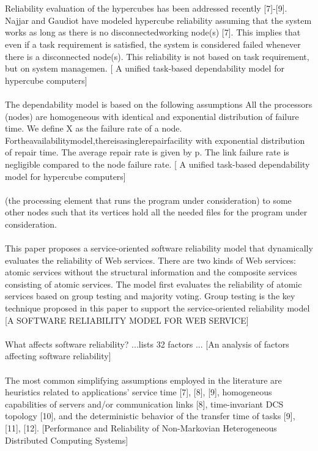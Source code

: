 \documentclass{cslthse-msc}
\begin{document}
\\\\
Reliability evaluation of the hypercubes has been addressed recently [7]-[9]. Najjar and Gaudiot have modeled hypercube reliability assuming that the system works as long as there is no disconnectedworking node(s) [7]. This implies that even if a task requirement is satisfied, the system is considered failed whenever there is a disconnected node(s). This reliability is not based on task requirement, but on system managemen.  [ A unified task-based dependability model for hypercube computers]
\\\\
The dependability model is based on the following assumptions All the processors (nodes) are homogeneous with identical and exponential distribution of failure time. We define X as the failure rate of a node. Fortheavailabilitymodel,thereisasinglerepairfacility with exponential distribution of repair time. The average repair rate is given by p.
The link failure rate is negligible compared to the node failure rate. [ A unified task-based dependability model for hypercube computers]
\\\\
(the processing element that runs the program under consideration) to some other nodes such that its vertices hold all the needed files for the program under consideration. \cite{Reliability analysis of distributed systems based on a fast reliability algorithm}
\\\\
This paper proposes a service-oriented software reliability model that dynamically evaluates the reliability of Web services. There are two kinds of Web services: atomic services without the structural information and the composite services consisting of atomic services. The model first evaluates the reliability of atomic services based on group testing and majority voting. Group testing is the key technique proposed in this paper to support the service-oriented reliability model [A SOFTWARE RELIABILITY MODEL FOR WEB SERVICE]
\\\\
What affects software reliability? ...lists 32 factors ... [An analysis of factors affecting software reliability]
\\\\
The most common simplifying assumptions employed in the literature are heuristics related to applications’ service time [7], [8], [9], homogeneous capabilities of servers and/or communication links [8], time-invariant DCS topology [10], and the deterministic behavior of the transfer time of tasks [9], [11], [12]. [Performance and Reliability of Non-Markovian Heterogeneous Distributed Computing Systems]
\end{document}
